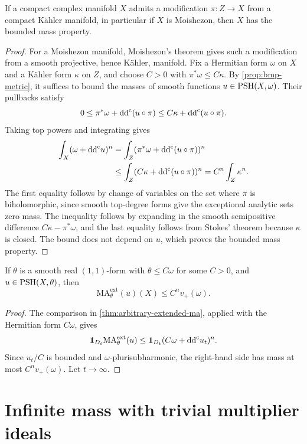 \begin{lemma}\label{lem:kahler-modification-bounded-mass}
If a compact complex manifold $X$ admits a modification $\pi\colon Z\to X$ from a compact K\"ahler manifold, in particular if $X$ is Moishezon, then $X$ has the bounded mass property.
\end{lemma}
\begin{proof}
For a Moishezon manifold, Moishezon's theorem gives such a modification from a smooth projective, hence K\"ahler, manifold. Fix a Hermitian form $\omega$ on $X$ and a K\"ahler form $\kappa$ on $Z$, and choose $C>0$ with $\pi^*\omega\leq C\kappa$. By \cref{prop:bmp-metric}, it suffices to bound the masses of smooth functions $u\in\mathrm{PSH}(X,\omega)$. Their pullbacks satisfy
\[
 0\leq\pi^*\omega+\mathrm{dd}^{\mathrm{c}}(u\circ\pi)
 \leq C\kappa+\mathrm{dd}^{\mathrm{c}}(u\circ\pi).
\]
Taking top powers and integrating gives
\[
 \begin{split}
 \int_X(\omega+\mathrm{dd}^{\mathrm{c}} u)^n
 &=\int_Z(\pi^*\omega+\mathrm{dd}^{\mathrm{c}}(u\circ\pi))^n\\
 &\leq\int_Z(C\kappa+\mathrm{dd}^{\mathrm{c}}(u\circ\pi))^n
 =C^n\int_Z\kappa^n.
 \end{split}
\]
The first equality follows by change of variables on the set where $\pi$ is biholomorphic, since smooth top-degree forms give the exceptional analytic sets zero mass. The inequality follows by expanding in the smooth semipositive difference $C\kappa-\pi^*\omega$, and the last equality follows from Stokes' theorem because $\kappa$ is closed. The bound does not depend on $u$, which proves the bounded mass property.
\end{proof}

\begin{proposition}\label{prop:bmp-finite}
If $\theta$ is a smooth real $(1,1)$-form with $\theta\leq C\omega$ for some $C>0$, and $u\in\mathrm{PSH}(X,\theta)$, then
\[
 \mathrm{MA}^{\mathrm{ext}}_\theta(u)(X)\leq C^n v_+(\omega).
\]
\end{proposition}
\begin{proof}
The comparison in \cref{thm:arbitrary-extended-ma}, applied with the Hermitian form $C\omega$, gives
\[
 \mathbf1_{D_t}\mathrm{MA}^{\mathrm{ext}}_\theta(u)
 \leq\mathbf1_{D_t}(C\omega+\mathrm{dd}^{\mathrm{c}} u_t)^n.
\]
Since $u_t/C$ is bounded and $\omega$-plurisubharmonic, the right-hand side has mass at most $C^n v_+(\omega)$. Let $t\to\infty$.
\end{proof}

\section{Infinite mass with trivial multiplier ideals}

